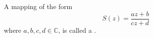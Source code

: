 A mapping of the form
$$S(z) = \frac{az+b}{cz+d}$$
where $a, b, c, d \in \mathbb{C}$, is called a .
